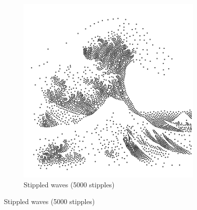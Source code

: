 \begin{figure}[!htb]
\begin{subfigure}[h]{0.4\linewidth}
\includegraphics[width=\linewidth]{images/voronoi_wave_default_stipples.png}
\caption{Stippled waves (5000 stipples)}
\end{subfigure}%


\end{figure}
